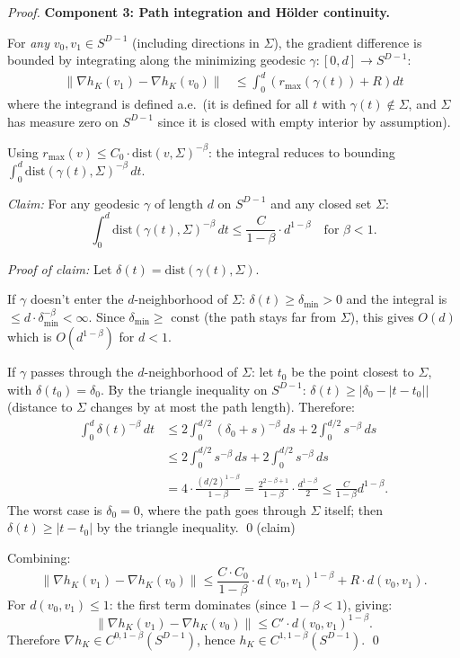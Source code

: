 \begin{proof}
\textbf{Component 3: Path integration and H\"older continuity.}

For \emph{any} $v_0, v_1 \in S^{D-1}$ (including directions in $\Sigma$), the gradient difference is bounded by integrating along the minimizing geodesic $\gamma : [0, d] \to S^{D-1}$:
\begin{align}
  \|\nabla h_K(v_1) - \nabla h_K(v_0)\| &\leq \int_0^d \left(r_{\max}(\gamma(t)) + R\right) dt \label{eq:path}
\end{align}
where the integrand is defined a.e.\ (it is defined for all $t$ with $\gamma(t) \notin \Sigma$, and $\Sigma$ has measure zero on $S^{D-1}$ since it is closed with empty interior by assumption).

Using $r_{\max}(v) \leq C_0 \cdot \mathrm{dist}(v, \Sigma)^{-\beta}$: the integral reduces to bounding $\int_0^d \mathrm{dist}(\gamma(t), \Sigma)^{-\beta} \, dt$.

\emph{Claim:} For any geodesic $\gamma$ of length $d$ on $S^{D-1}$ and any closed set $\Sigma$:
\[
  \int_0^d \mathrm{dist}(\gamma(t), \Sigma)^{-\beta} \, dt \leq \frac{C}{1-\beta} \cdot d^{1-\beta} \quad \text{for } \beta < 1.
\]

\emph{Proof of claim:} Let $\delta(t) = \mathrm{dist}(\gamma(t), \Sigma)$.

If $\gamma$ doesn't enter the $d$-neighborhood of $\Sigma$: $\delta(t) \geq \delta_{\min} > 0$ and the integral is $\leq d \cdot \delta_{\min}^{-\beta} < \infty$. Since $\delta_{\min} \geq $ const (the path stays far from $\Sigma$), this gives $O(d)$ which is $O(d^{1-\beta})$ for $d < 1$.

If $\gamma$ passes through the $d$-neighborhood of $\Sigma$: let $t_0$ be the point closest to $\Sigma$, with $\delta(t_0) = \delta_0$. By the triangle inequality on $S^{D-1}$: $\delta(t) \geq |\delta_0 - |t - t_0||$ (distance to $\Sigma$ changes by at most the path length). Therefore:
\begin{align*}
  \int_0^d \delta(t)^{-\beta} \, dt &\leq 2 \int_0^{d/2} (\delta_0 + s)^{-\beta} \, ds + 2\int_0^{d/2} s^{-\beta} \, ds \\
  &\leq 2 \int_0^{d/2} s^{-\beta} \, ds + 2\int_0^{d/2} s^{-\beta} \, ds \\
  &= 4 \cdot \frac{(d/2)^{1-\beta}}{1-\beta} = \frac{2^{2-\beta+1}}{1-\beta} \cdot \frac{d^{1-\beta}}{2} \leq \frac{C}{1-\beta} d^{1-\beta}.
\end{align*}
The worst case is $\delta_0 = 0$, where the path goes through $\Sigma$ itself; then $\delta(t) \geq |t - t_0|$ by the triangle inequality. \qed (claim)

Combining:
\[
  \|\nabla h_K(v_1) - \nabla h_K(v_0)\| \leq \frac{C \cdot C_0}{1-\beta} \cdot d(v_0, v_1)^{1-\beta} + R \cdot d(v_0, v_1).
\]
For $d(v_0, v_1) \leq 1$: the first term dominates (since $1-\beta < 1$), giving:
\[
  \|\nabla h_K(v_1) - \nabla h_K(v_0)\| \leq C' \cdot d(v_0, v_1)^{1-\beta}.
\]
Therefore $\nabla h_K \in C^{0, 1-\beta}(S^{D-1})$, hence $h_K \in C^{1, 1-\beta}(S^{D-1})$. \qed
\end{proof}

